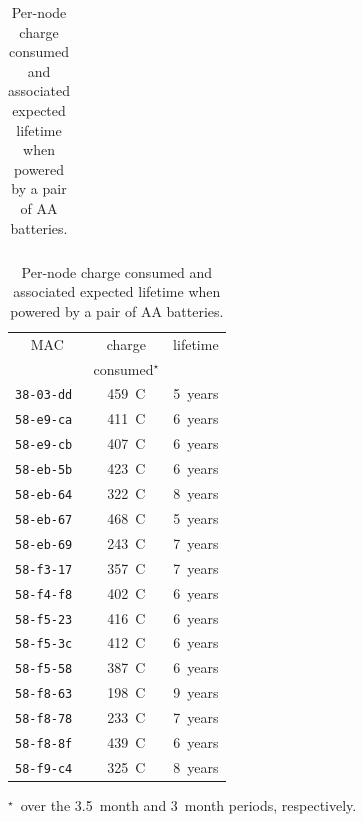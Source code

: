 \documentclass{elsarticle}
\newcommand{\building}            {Smart Building\xspace}
\newcommand{\agri}                {Smart Agriculture\xspace}
\begin{document}
\begin{table}
\begin{subtable}{.5\textwidth}
\begin{tabular}{|c|c|r|}
        \bottomrule
    \end{tabular}
    \caption{\agri}
\end{subtable}\hfill
\begin{subtable}{.43\textwidth}
    \begin{tabular}{|c|c|c|}
        \toprule
        MAC           &  charge          & lifetime \\
                      & consumed$^\star$ &          \\
        \midrule
        \tt{38-03-dd} &            459~C &  5~years \\
        \tt{58-e9-ca} &            411~C &  6~years \\
        \tt{58-e9-cb} &            407~C &  6~years \\
        \tt{58-eb-5b} &            423~C &  6~years \\
        \tt{58-eb-64} &            322~C &  8~years \\
        \tt{58-eb-67} &            468~C &  5~years \\
        \tt{58-eb-69} &            243~C &  7~years \\
        \tt{58-f3-17} &            357~C &  7~years \\
        \tt{58-f4-f8} &            402~C &  6~years \\
        \tt{58-f5-23} &            416~C &  6~years \\
        \tt{58-f5-3c} &            412~C &  6~years \\
        \tt{58-f5-58} &            387~C &  6~years \\
        \tt{58-f8-63} &            198~C &  9~years \\
        \tt{58-f8-78} &            233~C &  7~years \\
        \tt{58-f8-8f} &            439~C &  6~years \\
        \tt{58-f9-c4} &            325~C &  8~years \\
        \bottomrule
    \end{tabular}
    \caption{\building}
\end{subtable}\hfill
\vspace{2mm}
$^\star$~over the 3.5~month and 3~month periods, respectively.
\caption{Per-node charge consumed and associated expected lifetime when powered by a pair of AA batteries.}
\label{tab:stats_charge}
\end{table}

\end{document}
